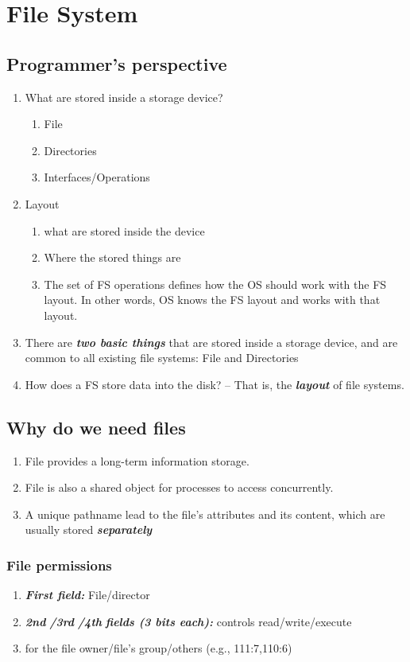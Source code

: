 \documentclass[]{report}
\renewcommand{\emph}[1]{\textbf{\textit{#1}}}
\begin{document}
	\chapter{File System}
	\section{Programmer's perspective}
		\begin{enumerate}
			\item What are stored inside a storage device?
			\begin{enumerate}
				\item File
				\item Directories
				\item Interfaces/Operations
			\end{enumerate}
			\item Layout
			\begin{enumerate}
				\item what are stored inside the device
				\item Where the stored things are
				\item The set of FS operations defines how the OS should work with the FS layout. In other words, OS knows the FS layout and works with that layout.
			\end{enumerate}
			\item There are \emph{two basic things} that are stored inside a storage device, and are common to all existing file systems: File and Directories
			\item How does a FS store data into the disk? – That is, the \emph{layout} of file systems.
		\end{enumerate}
	\section{Why do we need files}
		\begin{enumerate}
			\item File provides a long-term information storage.
			\item File is also a shared object for processes to access concurrently.
			\item A unique pathname lead to the file's attributes and its content, which are usually stored \emph{separately}
		\end{enumerate}

		\subsection{File permissions}
		\begin{enumerate}
			\item \emph{First field:} File/director
			\item \emph{2nd} \emph{/3rd} \emph{/4th} \emph{fields (3 bits each):} controls read/write/execute
			\item for the file owner/file’s group/others (e.g., 111:7,110:6)
		\end{enumerate}
\end{document}
